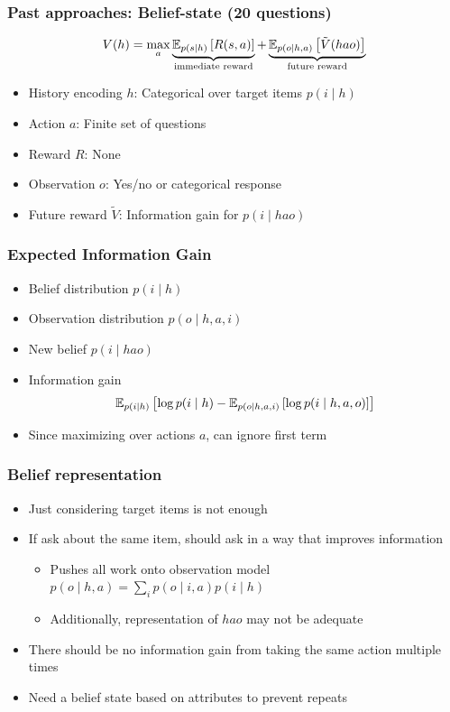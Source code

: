 \documentclass{beamer}
\begin{document}
\begin{frame}
\frametitle{Past approaches: Belief-state (20 questions)}
\begin{equation*}
V(h) = \max_a \underbrace{\mathbb{E}_{p(s \mid h)}\left[R(s, a)\right]}_{\text{immediate reward}}
+ \underbrace{\mathbb{E}_{p(o\mid h, a)}\left[\tilde{V}(hao)\right]}_{\text{future reward}}
\end{equation*}
    \begin{itemize}
    \item History encoding $h$: Categorical over target items $p(i \mid h)$
    \item Action $a$: Finite set of questions
    \item Reward $R$: None
    \item Observation $o$: Yes/no or categorical response
    \item Future reward $\tilde{V}$: Information gain for $p(i \mid hao)$
    \end{itemize}
\end{frame}

\begin{frame}
\frametitle{Expected Information Gain}
\begin{itemize}
\item Belief distribution $p(i\mid h)$
\item Observation distribution $p(o \mid h, a, i)$
\item New belief $p(i \mid hao)$
\item Information gain
$$\mathbb{E}_{p(i \mid h)}\left[\log p(i \mid h) - \mathbb{E}_{p(o \mid h,a,i)}\left[\log p(i\mid h,a,o)\right]\right]$$
\item Since maximizing over actions $a$, can ignore first term
\end{itemize}
\end{frame}

\begin{frame}
\frametitle{Belief representation}
\begin{itemize}
\item Just considering target items is not enough
\item If ask about the same item, should ask in a way that improves information
    \begin{itemize}
    \item Pushes all work onto observation model $p(o \mid h, a) = \sum_ip(o \mid i, a)p(i \mid h)$
    \item Additionally, representation of $hao$ may not be adequate
    \end{itemize}
\item There should be no information gain from taking the same action multiple times
\item Need a belief state based on attributes to prevent repeats
\end{itemize}
\end{frame}
\end{document}

